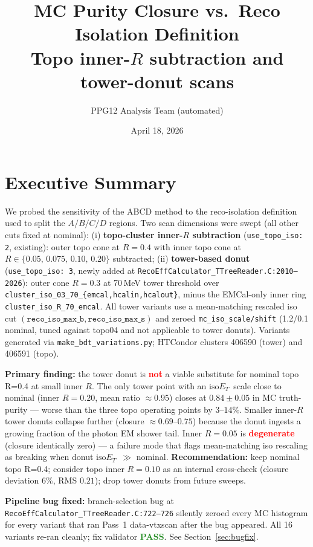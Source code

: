 \documentclass[11pt,a4paper]{article}
\title{MC Purity Closure vs.\ Reco Isolation Definition\\
\large Topo inner-$R$ subtraction and tower-donut scans}
\author{PPG12 Analysis Team (automated)}
\date{April 18, 2026}
\newcommand{\isoET}{$\mathrm{iso}E_T$}
\newcommand{\crit}[1]{\textcolor{red}{\textbf{#1}}}
\newcommand{\pass}[1]{\textcolor{ForestGreen}{\textbf{#1}}}
\begin{document}
\maketitle

\section*{Executive Summary}

We probed the sensitivity of the ABCD method to the reco-isolation
definition used to split the $A/B/C/D$ regions.
Two scan dimensions were swept (all other cuts fixed at nominal):
(i) \textbf{topo-cluster inner-$R$ subtraction} (\texttt{use\_topo\_iso:
2}, existing): outer topo cone at $R=0.4$ with inner topo cone at
$R\in\{0.05,\,0.075,\,0.10,\,0.20\}$ subtracted;
(ii) \textbf{tower-based donut} (\texttt{use\_topo\_iso: 3}, newly
added at \texttt{RecoEffCalculator\_TTreeReader.C:2010--2026}):
outer cone $R=0.3$ at 70\,MeV tower threshold over
\texttt{cluster\_iso\_03\_70\_\{emcal,hcalin,hcalout\}}, minus the
EMCal-only inner ring \texttt{cluster\_iso\_R\_70\_emcal}.
All tower variants use a mean-matching rescaled iso cut
$(\texttt{reco\_iso\_max\_b}, \texttt{reco\_iso\_max\_s})$ and
zeroed \texttt{mc\_iso\_scale/shift} (1.2/0.1 nominal, tuned against
topo04 and not applicable to tower donuts). Variants generated via
\texttt{make\_bdt\_variations.py}; HTCondor clusters 406590 (tower)
and 406591 (topo).

\textbf{Primary finding:} the tower donut is \crit{not} a viable
substitute for nominal topo R=0.4 at small inner $R$. The only tower
point with an \isoET\ scale close to nominal (inner $R=0.20$,
mean ratio $\approx 0.95$) closes at $0.84\pm 0.05$ in MC
truth-purity --- worse than the three topo operating points by
$3$--$14\%$. Smaller inner-$R$ tower donuts collapse further
(closure $\approx 0.69$--$0.75$) because the donut ingests a growing
fraction of the photon EM shower tail. Inner $R=0.05$ is
\crit{degenerate} (closure identically zero) --- a failure mode that
flags mean-matching iso rescaling as breaking when donut \isoET\
$\gg$ nominal. \textbf{Recommendation:} keep nominal topo R=0.4;
consider topo inner $R=0.10$ as an internal cross-check
(closure deviation $6\%$, RMS $0.21$); drop tower donuts from
future sweeps.

\textbf{Pipeline bug fixed:} branch-selection bug at
\texttt{RecoEffCalculator\_TTreeReader.C:722--726} silently zeroed
every MC histogram for every variant that ran Pass~1 data-vtxscan
after the bug appeared. All 16 variants re-ran cleanly; fix
validator \pass{PASS}. See Section~\ref{sec:bugfix}.
\end{document}

